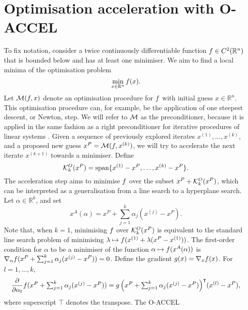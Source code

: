 \documentclass[main.tex]{subfiles}
\begin{document}
\section{Optimisation acceleration with O-ACCEL}\label{sec:algo_description}
To fix notation, consider a twice continuously differentiable function
$f\in C^2(\mathbb{R}^n)$ that is bounded below and has at least one
minimiser.  We aim to find a local minima of the optimisation problem
\begin{equation}
  \min_{x\in\mathbb{R}^n}f(x).
\end{equation}
Let $\mathcal{M}(f,x)$ denote an optimisation procedure for $f$ with
initial guess $x\in\mathbb{R}^n$. This optimisation procedure can, for
example, be the application of one steepest descent, or Newton,
step. We will refer to $\mathcal{M}$ as the preconditioner, because it is
applied in the same fashion as a right preconditioner for iterative
procedures of linear systems \citep{brune2015composing}.  Given a
sequence of previously explored iterates $x^{(1)},\dots,x^{(k)}$, and
a proposed new guess $x^P = \mathcal{M}(f,x^{(k)})$, we will try to
accelerate the next iterate $x^{(k+1)}$ towards a minimiser.  Define
\begin{equation}
  \mathcal{K}_{k}^O(x^P)=\mbox{span}\{x^{(1)}-x^P,\dots,x^{(k)}-x^P\}.
\end{equation}
The acceleration step aims to minimise $f$ over the subset
$x^P+\mathcal{K}_{k}^O(x^P)$, which can be interpreted as a generalisation
from a line search to a hyperplane search.  Let
$\alpha\in \mathbb{R}^k$, and set
\begin{equation}
  x^A(\alpha) = x^P + \sum_{j=1}^k\alpha_j(x^{(j)}-x^P).
\end{equation}
Note that, when $k=1$, minimising $f$ over $\mathcal{K}_{k}^O(x^P)$ is
equivalent to the standard line search problem of minimising
$\lambda \mapsto f(x^{(1)}+\lambda (x^P-x^{(1)}))$.  The
first-order condition for $\alpha$ to be a minimiser of the function
$\alpha\mapsto f(x^A(\alpha))$ is
$\nabla_{\alpha} f(x^P+\sum_{j=1}^k\alpha_j(x^{(j)}-x^P)) =0$.
Define the gradient $g(x)=\nabla_xf(x)$. For $l=1,\dots,k$,
\begin{equation}\label{eq:deriv_objective_alpha}
  \frac{\partial }{\partial \alpha_l}
  f({\textstyle x^P+\sum_{j=1}^k\alpha_j(x^{(j)}-x^P)})
  = {g\left({\textstyle x^P+\sum_{j=1}^k\alpha_j(x^{(j)}-x^P)}\right)}^\intercal
  (x^{(l)}-x^P),
\end{equation}
where superscript $\intercal$ denotes the transpose.  The O-ACCEL
\end{document}
